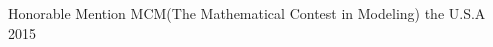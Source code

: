 




\begin{cvhonors}








\cvhonor
{Honorable Mention} %
{MCM(The Mathematical Contest in Modeling)} %
{the U.S.A} %
{2015} %


\end{cvhonors}




